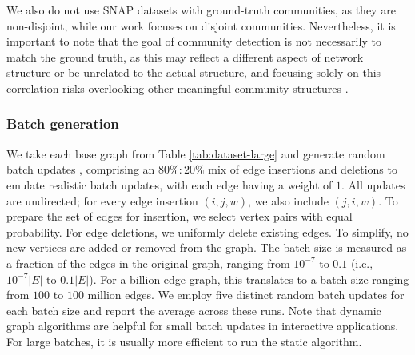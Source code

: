 We also do not use SNAP datasets with ground-truth communities, as they are non-disjoint, while our work focuses on disjoint communities. Nevertheless, it is important to note that the goal of community detection is not necessarily to match the ground truth, as this may reflect a different aspect of network structure or be unrelated to the actual structure, and focusing solely on this correlation risks overlooking other meaningful community structures \cite{peel2017ground}.


% 


\subsubsection{Batch generation}
\label{sec:batch-generation}

We take each base graph from Table \ref{tab:dataset-large} and generate random batch updates \cite{com-zarayeneh21}, comprising an $80\% : 20\%$ mix of edge insertions and deletions to emulate realistic batch updates, with each edge having a weight of $1$. All updates are undirected; for every edge insertion $(i, j, w)$, we also include $(j, i, w)$. To prepare the set of edges for insertion, we select vertex pairs with equal probability. For edge deletions, we uniformly delete existing edges. To simplify, no new vertices are added or removed from the graph. The batch size is measured as a fraction of the edges in the original graph, ranging from $10^{-7}$ to $0.1$ (i.e., $10^{-7}|E|$ to $0.1|E|$). For a billion-edge graph, this translates to a batch size ranging from $100$ to $100$ million edges. We employ five distinct random batch updates for each batch size and report the average across these runs. Note that dynamic graph algorithms are helpful for small batch updates in interactive applications. For large batches, it is usually more efficient to run the static algorithm.



